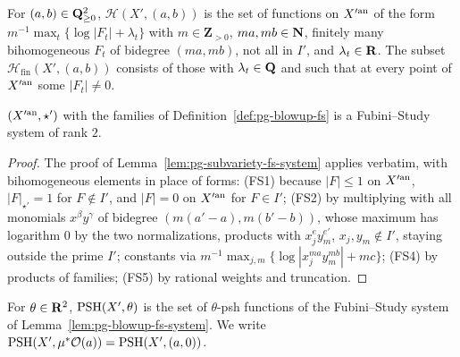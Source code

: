 \begin{definition}\label{def:pg-blowup-fs}
\leanok
{}
For $(a,b)\in\mathbf{Q}^2_{\ge0}$, $\mathcal H(X',(a,b))$ is the set of functions on $X'^{\mathrm{an}}$ of the form $m^{-1}\max_t\{\log|F_t|+\lambda_t\}$ with
$m\in\mathbf Z_{>0}$, $ma,mb\in\mathbf{N}$, finitely many bihomogeneous $F_t$ of bidegree $(ma,mb)$, not all in $I'$, and $\lambda_t\in\mathbf{R}$. The
subset $\mathcal H_{\mathrm{fin}}(X',(a,b))$ consists of those with $\lambda_t\in\mathbf{Q}$ and such that at every point of $X'^{\mathrm{an}}$ some $|F_t|\ne0$.
\end{definition}

\begin{lemma}\label{lem:pg-blowup-fs-system}
\leanok
{}
$(X'^{\mathrm{an}},\star')$ with the families of Definition~\ref{def:pg-blowup-fs} is a Fubini--Study system of rank $2$.
\end{lemma}

\begin{proof}
The proof of Lemma~\ref{lem:pg-subvariety-fs-system} applies verbatim, with bihomogeneous elements in place of forms: (FS1) because
$|F|\le1$ on $X'^{\mathrm{an}}$, $|F|_{\star'}=1$ for $F\notin I'$, and $|F|=0$ on $X'^{\mathrm{an}}$ for $F\in I'$; (FS2) by multiplying with all monomials
$x^\beta y^\gamma$ of bidegree $(m(a'-a),m(b'-b))$, whose maximum has logarithm $0$ by the two normalizations, products with
$x_j^{e}y_m^{e'}$, $x_j,y_m\notin I'$, staying outside the prime $I'$; constants via $m^{-1}\max_{j,m}\{\log|x_j^{ma}y_m^{mb}|+mc\}$; (FS4) by
products of families; (FS5) by rational weights and truncation.
\end{proof}

\begin{definition}\label{def:pg-blowup-psh}
\leanok
{}
For $\theta\in\mathbf{R}^2$, $\operatorname{PSH}(X',\theta)$ is the set of $\theta$-psh functions of the Fubini--Study system of
Lemma~\ref{lem:pg-blowup-fs-system}. We write $\operatorname{PSH}(X',\mu^*\mathcal O(a))=\operatorname{PSH}(X',(a,0))$.
\end{definition}

